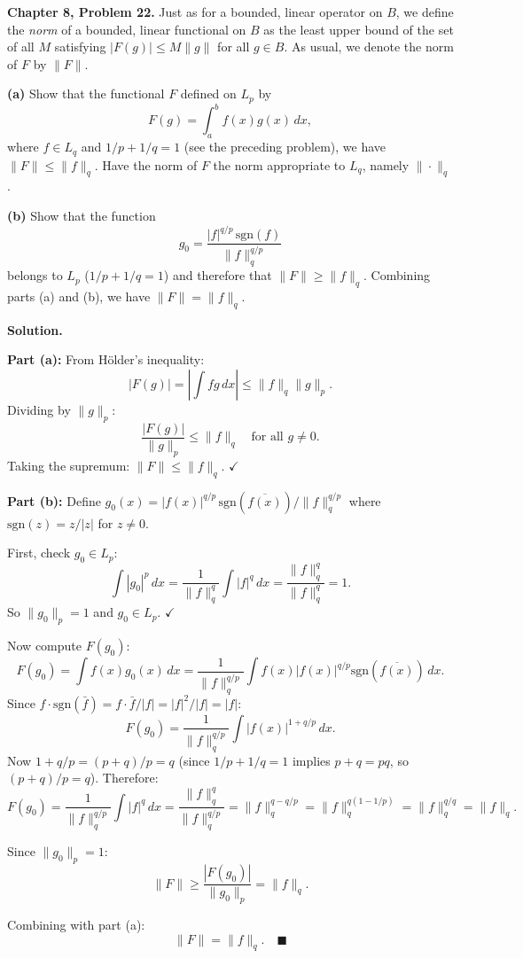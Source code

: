 \documentclass[12pt]{article}
\begin{document}
\textbf{Chapter 8, Problem 22.} Just as for a bounded, linear operator on $B$, we define the \emph{norm} of a bounded, linear functional on $B$ as the least upper bound of the set of all $M$ satisfying $|F(g)|\le M\|g\|$ for all $g\in B$. As usual, we denote the norm of $F$ by $\|F\|$.

\textbf{(a)} Show that the functional $F$ defined on $L_p$ by
\[
F(g) = \int_a^b f(x)g(x)\,dx,
\]
where $f\in L_q$ and $1/p+1/q=1$ (see the preceding problem), we have $\|F\| \le \|f\|_q$. Have the norm of $F$ the norm appropriate to $L_q$, namely $\|\cdot\|_q$.

\textbf{(b)} Show that the function
\[
g_0 = \frac{|f|^{q/p}\,\text{sgn}(f)}{\|f\|_q^{q/p}}
\]
belongs to $L_p$ ($1/p+1/q=1$) and therefore that $\|F\| \ge \|f\|_q$. Combining parts (a) and (b), we have $\|F\| = \|f\|_q$.

\bigskip
\textbf{Solution.}

\textbf{Part (a):}
From H\"older's inequality:
\[
|F(g)| = \left|\int fg\,dx\right| \le \|f\|_q\|g\|_p.
\]
Dividing by $\|g\|_p$:
\[
\frac{|F(g)|}{\|g\|_p} \le \|f\|_q \quad\text{for all }g\neq 0.
\]
Taking the supremum: $\|F\| \le \|f\|_q$. $\checkmark$

\textbf{Part (b):}
Define $g_0(x) = |f(x)|^{q/p}\,\text{sgn}(\overline{f(x)})/\|f\|_q^{q/p}$ where $\text{sgn}(z) = z/|z|$ for $z\neq 0$.

First, check $g_0\in L_p$:
\[
\int|g_0|^p\,dx = \frac{1}{\|f\|_q^q}\int|f|^q\,dx = \frac{\|f\|_q^q}{\|f\|_q^q} = 1.
\]
So $\|g_0\|_p = 1$ and $g_0\in L_p$. $\checkmark$

Now compute $F(g_0)$:
\[
F(g_0) = \int f(x)g_0(x)\,dx = \frac{1}{\|f\|_q^{q/p}}\int f(x)|f(x)|^{q/p}\text{sgn}(\overline{f(x)})\,dx.
\]
Since $f\cdot\text{sgn}(\bar{f}) = f\cdot\bar{f}/|f| = |f|^2/|f| = |f|$:
\[
F(g_0) = \frac{1}{\|f\|_q^{q/p}}\int|f(x)|^{1+q/p}\,dx.
\]
Now $1+q/p = (p+q)/p = q$ (since $1/p+1/q=1$ implies $p+q=pq$, so $(p+q)/p = q$). Therefore:
\[
F(g_0) = \frac{1}{\|f\|_q^{q/p}}\int|f|^q\,dx = \frac{\|f\|_q^q}{\|f\|_q^{q/p}} = \|f\|_q^{q-q/p} = \|f\|_q^{q(1-1/p)} = \|f\|_q^{q/q} = \|f\|_q.
\]

Since $\|g_0\|_p=1$:
\[
\|F\| \ge \frac{|F(g_0)|}{\|g_0\|_p} = \|f\|_q.
\]

Combining with part (a):
\[
\boxed{\|F\| = \|f\|_q.} \quad\blacksquare
\]
\end{document}
